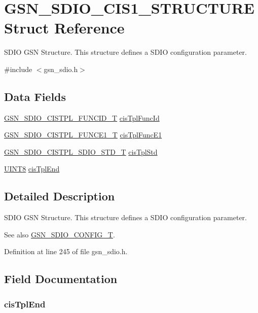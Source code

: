 \hypertarget{a00218}{
\section{GSN\_\-SDIO\_\-CIS1\_\-STRUCTURE Struct Reference}
\label{a00218}
}


SDIO GSN Structure. This structure defines a SDIO configuration parameter.  




{\ttfamily \#include $<$gsn\_\-sdio.h$>$}

\subsection*{Data Fields}
\begin{DoxyCompactItemize}
\item 
\hyperlink{a00221}{GSN\_\-SDIO\_\-CISTPL\_\-FUNCID\_\-T} \hyperlink{a00218_a0ab47728bbe9b5f06828d5c1d110fb15}{cisTplFuncId}
\item 
\hyperlink{a00220}{GSN\_\-SDIO\_\-CISTPL\_\-FUNCE1\_\-T} \hyperlink{a00218_adf00628b0e4d779c9c1fb7b24002cf69}{cisTplFuncE1}
\item 
\hyperlink{a00223}{GSN\_\-SDIO\_\-CISTPL\_\-SDIO\_\-STD\_\-T} \hyperlink{a00218_adff68410d180af6eb7daf71634354b8f}{cisTplStd}
\item 
\hyperlink{a00660_gab27e9918b538ce9d8ca692479b375b6a}{UINT8} \hyperlink{a00218_aa6758ae248de0b57e82ba9ce0f02631e}{cisTplEnd}
\end{DoxyCompactItemize}


\subsection{Detailed Description}
SDIO GSN Structure. This structure defines a SDIO configuration parameter. 

\begin{DoxySeeAlso}{See also}
\hyperlink{a00653_ga741fda4dc2cd93143a8a73ddaace7de8}{GSN\_\-SDIO\_\-CONFIG\_\-T}. 
\end{DoxySeeAlso}


Definition at line 245 of file gsn\_\-sdio.h.



\subsection{Field Documentation}
\hypertarget{a00218_aa6758ae248de0b57e82ba9ce0f02631e}{
\subsubsection[{cisTplEnd}]{ {\bf cisTplEnd}}}
\label{a00218_aa6758ae248de0b57e82ba9ce0f02631e}


